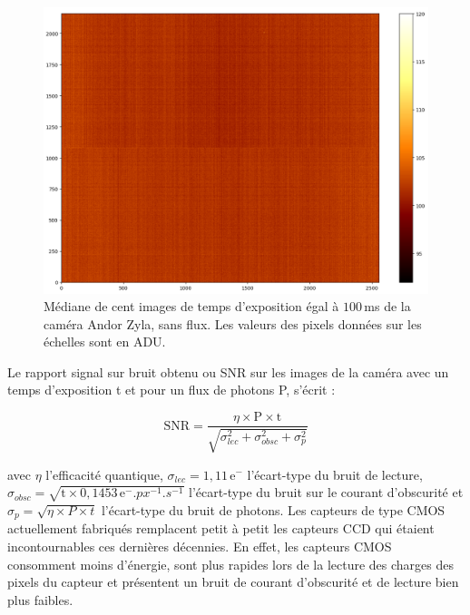 \begin{figure}[ht!]
    \centering
    \includegraphics[width=\figwidth]{Figure_Chap3/20220705_DarkFullImage_100ms_24C_median.png}
    \caption[Image sans flux de la caméra Andor Zyla de FIRSTv2.]{Médiane de cent images de temps d'exposition égal à $100 \,$ms de la caméra Andor Zyla, sans flux. Les valeurs des pixels données sur les échelles sont en \ac{ADU}.}
    \label{fig:CameraDark}
\end{figure}

Le rapport signal sur bruit obtenu ou \ac{SNR} sur les images de la caméra avec un temps d'exposition t et pour un flux de photons P, s'écrit :

\begin{equation}
    \text{SNR} = \frac{\eta \times \text{P} \times \text{t}}{\sqrt{\sigma_{lec}^{2} + \sigma_{obsc}^{2} + \sigma_{p}^{2}}}
\end{equation}

\noindent avec $\eta$ l'efficacité quantique, $\sigma_{lec} = 1,11 \,\text{e}^-$ l'écart-type du bruit de lecture, $\sigma_{obsc} = \sqrt{\text{t} \times 0,1453 \,\text{e}^-.px^{-1}.s^{-1}}$ l'écart-type du bruit sur le courant d'obscurité et $\sigma_{p} = \sqrt{\eta \times P \times t}$ l'écart-type du bruit de photons. Les capteurs de type \ac{CMOS} actuellement fabriqués remplacent petit à petit les capteurs \ac{CCD} qui étaient incontournables ces dernières décennies. En effet, les capteurs \ac{CMOS} consomment moins d'énergie, sont plus rapides lors de la lecture des charges des pixels du capteur et présentent un bruit de courant d'obscurité et de lecture bien plus faibles.

